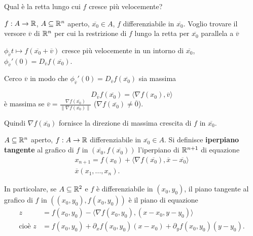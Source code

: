 Qual è la retta lungo cui $f$ cresce più velocemente?


$f:A \rightarrow\mathbb{R}$, $A\subseteq\mathbb{R}^n$ aperto, $\overline{x_0}\in A$, $f$ differenziabile in $\overline{x_0}$. Voglio trovare il versore $\overline{v}$ di $\mathbb{R}^n$ per cui la restrizione di $f$ lungo la retta per $\overline{x_0}$ parallela a $\overline{v}$

$\phi_{\overline{v}}t\mapsto f(\overline{x_0}+\overline{v})$ cresce più velocemente in un intorno di $\overline{x_0}$, $\phi_{\overline{v}}'(0)=D_{\overline{v}}f(\overline{x_0})$.

Cerco $\overline{v}$ in modo che $\phi_{\overline{v}}'(0)=D_{\overline{v}}f(\overline{x_0})$ sia massima

$$D_{\overline{v}}f(\overline{x_0})=\langle \nabla f(x_0),\overline{v} \rangle$$ è massima se $\overline{v}=\frac{\nabla f(\overline{x_0})}{\|\nabla f(\overline{x_0})\|}$ ($\nabla f(\overline{x_0})\neq \overline{0}$).

Quindi $\nabla f(\overline{x_0})$ fornisce la direzione di massima crescita di $f$ in $\overline{x_0}$.



\begin{definition}
	$A\subseteq\mathbb{R}^n$ aperto, $f:A \rightarrow \mathbb{R}$ differenziabile in $\overline{x_0}\in A$. Si definisce \textbf{iperpiano tangente} al grafico di $f$ in $(\overline{x_0},f(\overline{x_0}))$ l'iperpiano di $\mathbb{R}^{n+1}$ di equazione
	\begin{gather*}
		x_{n+1}=f(x_0)+\langle \nabla f(\overline{x_0}), \overline{x}-\overline{x_0} \rangle
		\\
		\overline{x}(x_1,...,x_n).
	\end{gather*}
	
	In particolare, se $A \subseteq \mathbb{R}^2$ e $f$ è differenziabile in $(x_0,y_0)$, il piano tangente al grafico di $f$ in $((x_0,y_0),f(x_0,y_0))$ è il piano di equazione
	\begin{align*}
		z&=f(x_0,y_0)-\langle \nabla f(x_0,y_0),(x-x_0,y-y_0) \rangle
		\\
		\text{cioè }z&=f(x_0,y_0)+\partial_xf(x_0,y_0)(x-x_0)+\partial_yf(x_0,y_0)(y-y_0).
	\end{align*}
\end{definition}


